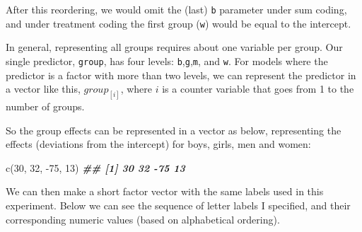 \documentclass[
]{book}
\newenvironment{Shaded}{\begin{snugshade}}{\end{snugshade}}
\newcommand{\AttributeTok}[1]{\textcolor[rgb]{0.77,0.63,0.00}{#1}}
\newcommand{\CommentTok}[1]{\textcolor[rgb]{0.56,0.35,0.01}{\textit{#1}}}
\newcommand{\DecValTok}[1]{\textcolor[rgb]{0.00,0.00,0.81}{#1}}
\newcommand{\DocumentationTok}[1]{\textcolor[rgb]{0.56,0.35,0.01}{\textbf{\textit{#1}}}}
\newcommand{\FunctionTok}[1]{\textcolor[rgb]{0.00,0.00,0.00}{#1}}
\newcommand{\NormalTok}[1]{#1}
\newcommand{\OtherTok}[1]{\textcolor[rgb]{0.56,0.35,0.01}{#1}}
\newcommand{\SpecialCharTok}[1]{\textcolor[rgb]{0.00,0.00,0.00}{#1}}
\newcommand{\StringTok}[1]{\textcolor[rgb]{0.31,0.60,0.02}{#1}}
\begin{document}
\begin{Shaded}
\end{Shaded}

After this reordering, we would omit the (last) \texttt{b} parameter under sum coding, and under treatment coding the first group (\texttt{w}) would be equal to the intercept.

In general, representing all groups requires about one variable per group. Our single predictor, \texttt{group}, has four levels: \texttt{b},\texttt{g},\texttt{m}, and \texttt{w}. For models where the predictor is a factor with more than two levels, we can represent the predictor in a vector like this, \(group_{[i]}\), where \(i\) is a counter variable that goes from 1 to the number of groups.

So the group effects can be represented in a vector as below, representing the effects (deviations from the intercept) for boys, girls, men and women:

\begin{Shaded}
\begin{Highlighting}[]
\FunctionTok{c}\NormalTok{(}\DecValTok{30}\NormalTok{, }\DecValTok{32}\NormalTok{, }\SpecialCharTok{{-}}\DecValTok{75}\NormalTok{, }\DecValTok{13}\NormalTok{)}
\DocumentationTok{\#\# [1]  30  32 {-}75  13}
\end{Highlighting}
\end{Shaded}

We can then make a short factor vector with the same labels used in this experiment. Below we can see the sequence of letter labels I specified, and their corresponding numeric values (based on alphabetical ordering).
\end{document}
